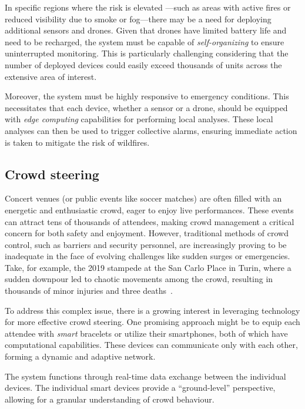 In specific regions where the risk is elevated
 ---such as areas with active fires or reduced visibility due to smoke or fog---there may be a need for deploying additional sensors and drones. 
 Given that drones have limited battery life and need to be recharged, 
 the system must be capable of \emph{self-organizing} to ensure uninterrupted monitoring. 
 This is particularly challenging considering that the number of deployed devices could easily exceed thousands of units across the extensive area of interest.

Moreover, the system must be highly responsive to emergency conditions. 
 This necessitates that each device, whether a sensor or a drone, 
 should be equipped with \emph{edge computing} capabilities for performing local analyses. 
 These local analyses can then be used to trigger collective alarms, 
 ensuring immediate action is taken to mitigate the risk of wildfires.
\subsection{Crowd steering}
Concert venues (or public events like soccer matches) 
 are often filled with an energetic and enthusiastic crowd, 
 eager to enjoy live performances. 
 These events can attract tens of thousands of attendees, 
 making crowd management a critical concern for both safety and enjoyment. 
% 
However, traditional methods of crowd control, 
 such as barriers and security personnel, 
 are increasingly proving to be inadequate in the face of evolving challenges like sudden surges or emergencies. 
 Take, for example, the 2019 stampede at the San Carlo Place in Turin, 
 where a sudden downpour led to chaotic movements among the crowd, 
 resulting in thousands of minor injuries and three deaths~\cite{enwiki:1164182872}.

To address this complex issue, 
 there is a growing interest in leveraging technology for more effective crowd steering. 
 One promising approach might be to equip each attendee with \emph{smart} bracelets or utilize their smartphones, 
 both of which have computational capabilities. 
 These devices can communicate only with each other, 
 forming a dynamic and adaptive network.

The system functions through real-time data exchange 
 between the individual devices. %
 The individual smart devices provide a ``ground-level'' perspective, 
 allowing for a granular understanding of crowd behaviour.

